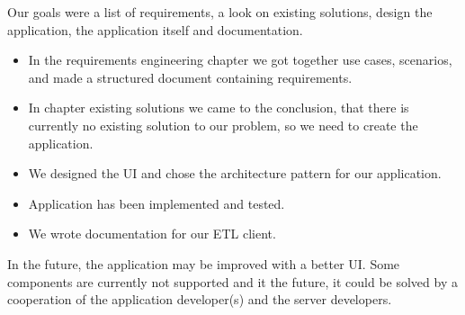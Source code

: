 Our goals were a list of requirements, a look on existing solutions, design the application, the application itself and documentation.

\begin{itemize}
    \item In the requirements engineering chapter we got together use cases, scenarios, and made a structured document containing requirements.
    \item In chapter existing solutions we came to the conclusion, that there is currently no existing solution to our problem, so we need to create the application.
    \item We designed the UI and chose the architecture pattern for our application.
    \item Application has been implemented and tested.
    \item We wrote documentation for our ETL client.
\end{itemize}

In the future, the application may be improved with a better UI.
Some components are currently not supported and it the future, it could be solved by a cooperation of the application developer(s) and the server developers.